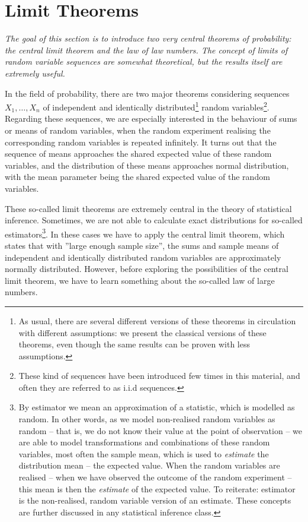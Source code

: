 \documentclass[12pt,a4paper,leqno]{report}
\theoremstyle{plain}
\theoremstyle{definition}
\begin{document}
\section{Limit Theorems}

\emph{The goal of this section is to introduce two very central theorems of probability: the central limit theorem and the law of law numbers. The concept of limits of random variable sequences are somewhat theoretical, but the results itself are extremely useful.}

In the field of probability, there are two major theorems considering sequences $X_1, \dots , X_n$ of independent and identically distributed\footnote{As usual, there are several different versions of these theorems in circulation with different assumptions: we present the classical versions of these theorems, even though the same results can be proven with less assumptions.} random variables\footnote{These kind of sequences have been introduced few times in this material, and often they are referred to as i.i.d sequences.}. Regarding these sequences, we are especially interested in the behaviour of sums or means of random variables, when the random experiment realising the corresponding random variables is repeated infinitely. It turns out that the sequence of means approaches the shared expected value of these random variables, and the distribution of these means approaches normal distribution, with the mean parameter being the shared expected value of the random variables. 

These so-called limit theorems are extremely central in the theory of statistical inference. Sometimes, we are not able to calculate exact distributions for so-called estimators\footnote{By estimator we mean an approximation of a statistic, which is modelled as random. In other words, as we model non-realised random variables as random -- that is, we do not know their value at the point of observation -- we are able to model transformations and combinations of these random variables, most often the sample mean, which is used to \emph{estimate} the distribution mean -- the expected value. When the random variables are realised -- when we have observed the outcome of the random experiment -- this mean is then the \emph{estimate} of the expected value. To reiterate: estimator is the non-realised, random variable version of an estimate. These concepts are further discussed in any statistical inference class.}. In these cases we have to apply the central limit theorem, which states that with ''large enough sample size'', the sums and sample means of independent and identically distributed random variables are approximately normally distributed. However, before exploring the possibilities of the central limit theorem, we have to learn something about the so-called law of large numbers.
\end{document}
